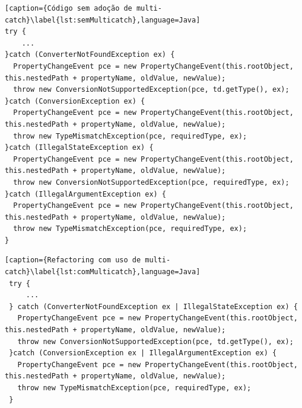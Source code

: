\begin{lstlisting}[caption={Código sem adoção de multi-catch}\label{lst:semMulticatch},language=Java] 
try {
	...
}catch (ConverterNotFoundException ex) {
  PropertyChangeEvent pce = new PropertyChangeEvent(this.rootObject, this.nestedPath + propertyName, oldValue, newValue);
  throw new ConversionNotSupportedException(pce, td.getType(), ex);
}catch (ConversionException ex) {
  PropertyChangeEvent pce = new PropertyChangeEvent(this.rootObject, this.nestedPath + propertyName, oldValue, newValue);
  throw new TypeMismatchException(pce, requiredType, ex);
}catch (IllegalStateException ex) {
  PropertyChangeEvent pce = new PropertyChangeEvent(this.rootObject, this.nestedPath + propertyName, oldValue, newValue);
  throw new ConversionNotSupportedException(pce, requiredType, ex);
}catch (IllegalArgumentException ex) {
  PropertyChangeEvent pce = new PropertyChangeEvent(this.rootObject, this.nestedPath + propertyName, oldValue, newValue);
  throw new TypeMismatchException(pce, requiredType, ex);
}
\end{lstlisting}


\begin{lstlisting}[caption={Refactoring com uso de multi-catch}\label{lst:comMulticatch},language=Java] 
 try {
	 ...
 } catch (ConverterNotFoundException ex | IllegalStateException ex) {
   PropertyChangeEvent pce = new PropertyChangeEvent(this.rootObject, this.nestedPath + propertyName, oldValue, newValue);
   throw new ConversionNotSupportedException(pce, td.getType(), ex);
 }catch (ConversionException ex | IllegalArgumentException ex) {
   PropertyChangeEvent pce = new PropertyChangeEvent(this.rootObject, this.nestedPath + propertyName, oldValue, newValue);
   throw new TypeMismatchException(pce, requiredType, ex);
 }	
\end{lstlisting}

